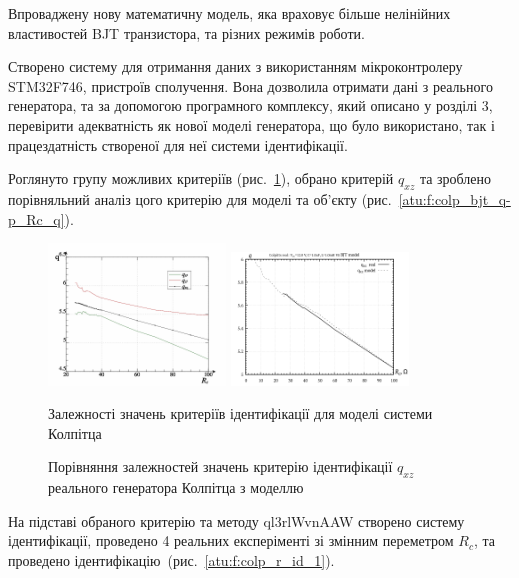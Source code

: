\documentclass[a4paper,13pt]{atuaref}
\begin{document}
Впроваджену нову математичну модель,
яка враховує більше нелінійних властивостей
BJT транзистора, та різних режимів роботи.


Створено систему для отримання даних з використанням мікроконтролеру STM32F746, пристроїв сполучення.
Вона дозволила отримати дані з реального
генератора, та за допомогою програмного комплексу,
який описано у розділі 3, перевірити адекватність як
нової моделі генератора, що було використано,
так і працездатність створеної для неї системи ідентифікації.

Роглянуто групу можливих критеріїв (рис.~\ref{atu:f:colp_q_cml}),
обрано критерій $q_{xz}$
та зроблено порівняльний аналіз цого критерію
для моделі та об'єкту (рис.~\ref{atu:f:colp_bjt_q-p_Rc_q}).

\begin{figure}[htb!]
  \includegraphics[width=0.42\textwidth]{p6/p/colp_read_q-p_Rc_q.png}
  \hfill
  \includegraphics[width=0.42\textwidth]{p6/p/colp_q_cml.png}
\\
\parbox[t]{0.45\textwidth}{
  \caption{Залежності значень критеріїв ідентифікації для моделі системи Колпітца}
  \label{atu:f:colp_bjt_q-p_Rc_q}
}
\hfill
\parbox[t]{0.45\textwidth}{
  \caption{Порівняння залежностей значень критерію ідентифікації $q_{xz}$ реального генератора Колпітца з моделлю}
  \label{atu:f:colp_q_cml}
}
\end{figure}

На підставі обраного критерію та методу ql3rlWvnAAW створено систему ідентифікації,
проведено 4 реальних експеріменті зі змінним переметром $R_c$,
та проведено ідентифікацію~(рис.~\ref{atu:f:colp_r_id_1}).
\end{document}
